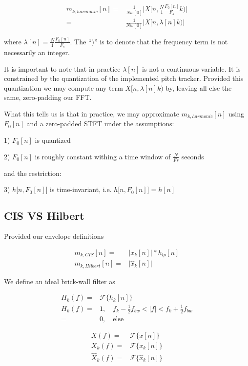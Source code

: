\documentclass [11pt, proquest] {uwthesis}[2015/03/03]
\begin{document}
\begin{align}
m_{k,harmonic}[n] =& \frac{1}{Nw[0]} \Bigg| X\Big[n, \frac{N}{1} \frac{F_0[n]}{F_s} k \Big) \Bigg| \nonumber \\
\label{eq:harmonic-to-stft}
=& \frac{1}{Nw[0]} \Bigg| X\Big[n, \lambda[n]k\Big) \Bigg|
\end{align}

where $\lambda[n] = \frac{N}{1} \frac{F_0[n]}{F_s}$.  The ``$)$'' is to denote that the frequency term is not necessarily an integer.

It is important to note that in practice $\lambda[n]$ is not a continuous variable.  It is constrained by the quantization of the implemented pitch tracker.  Provided this quantization we may compute any term $X[n, \lambda[n]k)$ by, leaving all else the same, zero-padding our FFT.

What this tells us is that in practice, we may approximate $m_{k,harmonic}[n]$ using $F_0[n]$ and a zero-padded STFT under the assumptions:

1) $F_0[n]$ is quantized

2) $F_0[n]$ is roughly constant withing a time window of $\frac{N}{Fs}$ seconds

and the restriction:

3) $h\Big[n, F_0[n] \Big]$ is time-invariant, i.e. $h\Big[n, F_0[n] \Big] = h[n]$

\subsection{CIS VS Hilbert}

Provided our envelope definitions

\begin{align}
m_{k,CIS}[n] =& \Big| x_k[n] \Big| * h_{lp}[n] \nonumber \\
m_{k,Hilbert}[n] =& \Big| \widehat{x}_k[n] \Big| \nonumber
\end{align}

We define an ideal brick-wall filter as

\begin{align}
H_k(f) =& \mathcal{F}\Big\{ h_k[n]  \Big\} \\
H_k(f) =& 1, \quad f_k - \frac{1}{2} f_{bw} < |f| < f_k + \frac{1}{2} f_{bw} \\
=& 0, \quad \mathrm{else}
\end{align}

\begin{align}
X(f) =& \mathcal{F}\Big\{ x[n] \Big\} \\
X_{k}(f) =& \mathcal{F}\Big\{ x_k[n] \Big\} \\
\widehat{X}_{k}(f) =& \mathcal{F}\Big\{ \widehat{x}_k[n]  \Big\}
\end{align}
\end{document}
